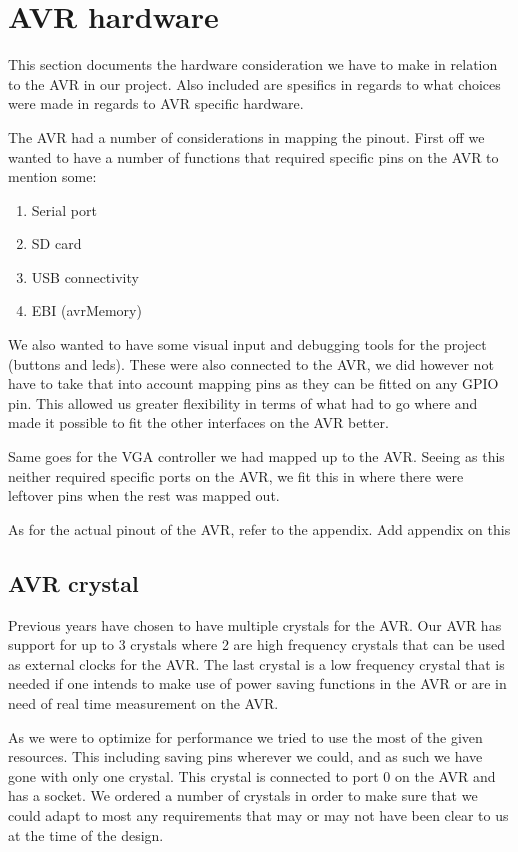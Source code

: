 \section{AVR hardware}

This section documents the hardware consideration we have to make in relation to the AVR in our project. Also included are spesifics in regards to what choices were made in regards to AVR specific hardware.

The AVR had a number of considerations in mapping the pinout. First off we wanted to have a number of functions that required specific pins on the AVR to mention some:

\begin{enumerate}
\item Serial port
\item SD card 
\item USB connectivity
\item EBI (avrMemory)
\end{enumerate}

We also wanted to have some visual input and debugging tools for the project (buttons and leds). These were also connected to the AVR, we did however not have to take that into account mapping pins as they can be fitted on any GPIO pin. This allowed us greater flexibility in terms of what had to go where and made it possible to fit the other interfaces on the AVR better.

Same goes for the VGA controller we had mapped up to the AVR. Seeing as this neither required specific ports on the AVR, we fit this in where there were leftover pins when the rest was mapped out.

As for the actual pinout of the AVR, refer to the appendix.
\TODO Add appendix on this

\subsection{AVR crystal}

Previous years have chosen to have multiple crystals for the AVR. Our AVR has support for up to 3 crystals where 2 are high frequency crystals that can be used as external clocks for the AVR. The last crystal is a low frequency crystal that is needed if one intends to make use of power saving functions in the AVR or are in need of real time measurement on the AVR.

As we were to optimize for performance we tried to use the most of the given resources. This including saving pins wherever we could, and as such we have gone with only one crystal. This crystal is connected to port 0 on the AVR and has a socket. We ordered a number of crystals in order to make sure that we could adapt to most any requirements that may or may not have been clear to us at the time of the design.


